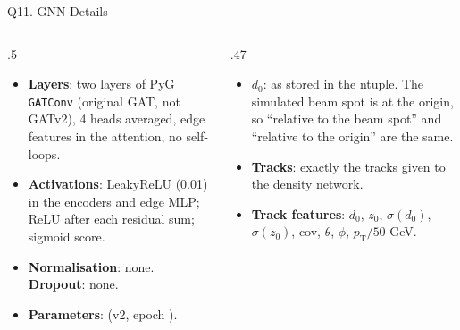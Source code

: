 \begin{frame}{Q11. GNN Details}
\footnotesize
\begin{columns}[T]
\begin{column}{.5\linewidth}
\begin{itemize}\setlength\itemsep{.3em}
\item \textbf{Layers}: two layers of PyG \texttt{GATConv} (original GAT, not GATv2), 4 heads averaged, edge features in the attention, no self-loops.
\item \textbf{Activations}: LeakyReLU (0.01) in the encoders and edge MLP; ReLU after each residual sum; sigmoid score.
\item \textbf{Normalisation}: none. \textbf{Dropout}: none.
\item \textbf{Parameters}: \gnnParams{} (v2, epoch \hlGnnEpoch).
\end{itemize}
\end{column}
\begin{column}{.47\linewidth}
\begin{itemize}\setlength\itemsep{.3em}
\item \textbf{$d_0$}: as stored in the ntuple. The simulated beam spot is at the origin, so ``relative to the beam spot'' and ``relative to the origin'' are the same.
\item \textbf{Tracks}: exactly the tracks given to the density network.
\item \textbf{Track features}: $d_0$, $z_0$, $\sigma(d_0)$, $\sigma(z_0)$, cov, $\theta$, $\phi$, $p_\mathrm{T}/50$ GeV.
\end{itemize}
\par\vspace{.5em}
\end{column}
\end{columns}
\end{frame}

